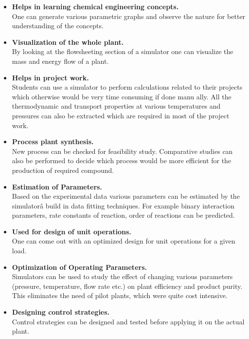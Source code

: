 \documentclass[12pt]{report}
\begin{document}
\begin{itemize}
\item{\textbf{Helps in learning chemical engineering concepts.}} \\
One can generate various parametric graphs and observe the nature for better understanding of the concepts.

\item{\textbf{Visualization of the whole plant.}} \\
By looking at the flowsheeting section of a simulator one can visualize the mass and energy flow of a plant.

\item{\textbf{Helps in project work.}} \\
Students can use a simulator to perform calculations related to their projects which otherwise would be very time consuming if done manu ally. All the thermodynamic and transport properties at various temperatures and pressures can also be extracted which are required in most of the project work.

\item{\textbf{Process plant synthesis.}} \\
New process can be checked for feasibility study. Comparative studies can also be performed to decide which process would be more efficient for the production of required compound.

\item{\textbf{Estimation of Parameters.}} \\
Based on the experimental data various parameters can be estimated by the simulatorâ  build in data fitting techniques. For example binary interaction parameters, rate constants of reaction, order of reactions can be predicted.

\item{\textbf{Used for design of unit operations.}} \\
One can come out with an optimized design for unit operations for a given load.

\item{\textbf{Optimization of Operating Parameters.}} \\
Simulators can be used to study the effect of changing various parameters (pressure, temperature, flow rate etc.) on plant efficiency and product purity. This eliminates the need of pilot plants, which were quite cost intensive.

\item{\textbf{Designing control strategies.}} \\
Control strategies can be designed and tested before applying it on the actual plant.


\end{itemize}
\end{document}
